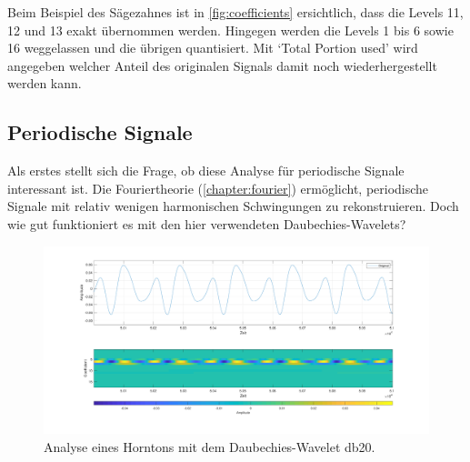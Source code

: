 \begin{refsection}
Beim Beispiel des Sägezahnes ist in \autoref{fig:coefficients} ersichtlich, dass die Levels 11, 12 und 13 exakt übernommen werden.
Hingegen werden die Levels 1 bis 6 sowie 16 weggelassen und die übrigen quantisiert.
Mit `Total Portion used' wird angegeben welcher Anteil des originalen Signals damit noch wiederhergestellt werden kann.

\subsection{Periodische Signale}
Als erstes stellt sich die Frage, ob diese Analyse für periodische Signale interessant ist.
Die Fouriertheorie (\autoref{chapter:fourier}) ermöglicht, periodische Signale mit relativ wenigen harmonischen Schwingungen zu rekonstruieren.
Doch wie gut funktioniert es mit den hier verwendeten Daubechies-Wavelets?

\begin{figure}
	\centering
	\includegraphics[width=\linewidth]{papers/compress/Bilder/frenchHorn_normal.pdf}
	\caption{Analyse eines Horntons mit dem Daubechies-Wavelet db20.}
	\label{fig:horn}
\end{figure}


\end{refsection}
